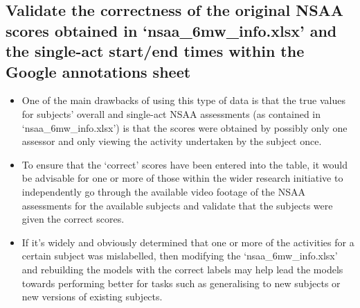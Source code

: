 \documentclass[12pt,twoside]{report}
\begin{document}
\subsection{Validate the correctness of the original NSAA scores obtained in ‘nsaa\_6mw\_info.xlsx’ and the single-act start/end times within the Google annotations sheet}
\begin{itemize}
	\item One of the main drawbacks of using this type of data is that the true values for subjects’ overall and single-act NSAA assessments (as contained in ‘nsaa\_6mw\_info.xlsx’) is that the scores were obtained by possibly only one assessor and only viewing the activity undertaken by the subject once.
	\item To ensure that the ‘correct’ scores have been entered into the table, it would be advisable for one or more of those within the wider research initiative to independently go through the available video footage of the NSAA assessments for the available subjects and validate that the subjects were given the correct scores.
	\item If it’s widely and obviously determined that one or more of the activities for a certain subject was mislabelled, then modifying the ‘nsaa\_6mw\_info.xlsx’ and rebuilding the models with the correct labels may help lead the models towards performing better for tasks such as generalising to new subjects or new versions of existing subjects.
\end{itemize}

\end{document}
